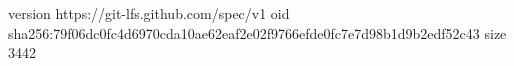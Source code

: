 version https://git-lfs.github.com/spec/v1
oid sha256:79f06dc0fc4d6970cda10ae62eaf2e02f9766efde0fc7e7d98b1d9b2edf52c43
size 3442
